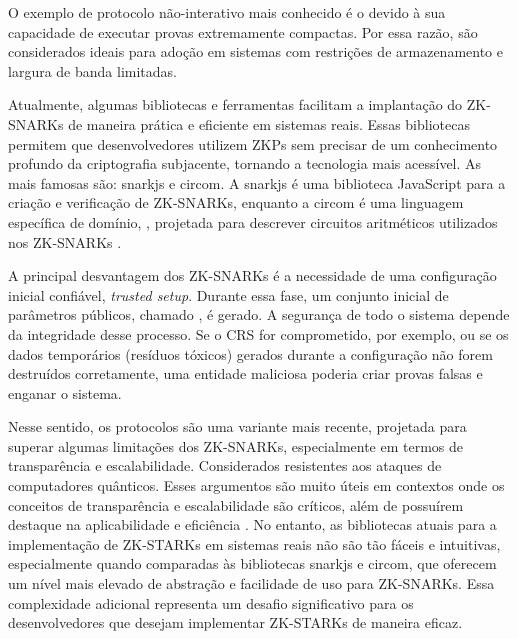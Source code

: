O exemplo de protocolo não-interativo mais conhecido é o  \cite{Farias2024ZKP} devido à sua capacidade de executar provas extremamente compactas. Por essa razão, são considerados ideais para adoção em sistemas com restrições de armazenamento e largura de banda limitadas.

Atualmente, algumas bibliotecas e ferramentas facilitam a implantação do \acs{ZK-SNARKs} de maneira prática e eficiente em sistemas reais. Essas bibliotecas permitem que desenvolvedores utilizem \acs{ZKP}s sem precisar de um conhecimento profundo da criptografia subjacente, tornando a tecnologia mais acessível. As mais famosas são: snarkjs e circom. A snarkjs é uma biblioteca JavaScript para a criação e verificação de \acs{ZK-SNARKs}, enquanto a circom é uma linguagem específica de domínio, , projetada para descrever circuitos aritméticos utilizados nos \acs{ZK-SNARKs} \cite{belles2023circom}. 

A principal desvantagem dos ZK-SNARKs é a necessidade de uma configuração inicial confiável, \textit{trusted setup}. Durante essa fase, um conjunto inicial de parâmetros públicos, chamado , é gerado. A segurança de todo o sistema depende da integridade desse processo. Se o \acs{CRS} for comprometido, por exemplo, ou se os dados temporários (resíduos tóxicos) gerados durante a configuração não forem destruídos corretamente, uma entidade maliciosa poderia criar provas falsas e enganar o sistema.

Nesse sentido, os protocolos   são uma variante mais recente, projetada para superar algumas limitações dos \acs{ZK-SNARKs}, especialmente em termos de transparência e escalabilidade. Considerados resistentes aos ataques de computadores quânticos. Esses argumentos são muito úteis em contextos onde os conceitos de transparência e escalabilidade são críticos, além de possuírem destaque na aplicabilidade e eficiência \cite{Farias2024ZKP}. No entanto, as bibliotecas atuais para a implementação de \acs{ZK-STARKs} em sistemas reais não são tão fáceis e intuitivas, especialmente quando comparadas às bibliotecas snarkjs e circom, que oferecem um nível mais elevado de abstração e facilidade de uso para \acs{ZK-SNARKs}. Essa complexidade adicional  representa um desafio significativo para os desenvolvedores que desejam implementar \acs{ZK-STARKs} de maneira eficaz.

